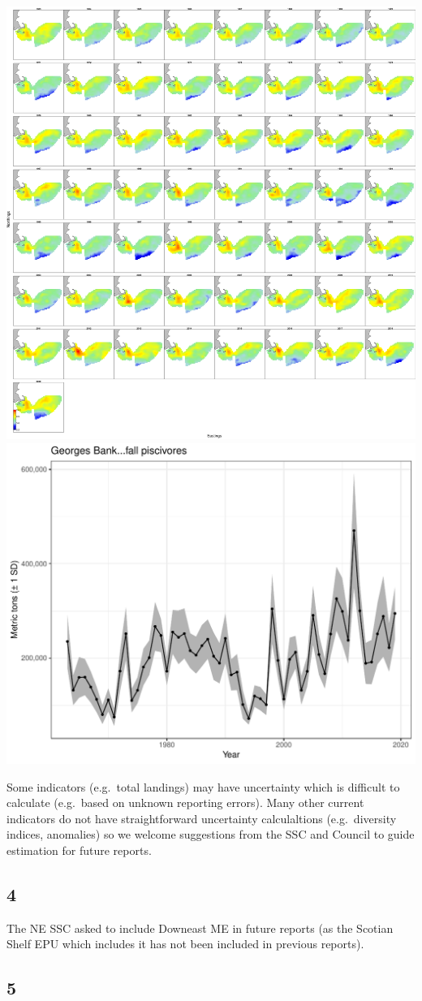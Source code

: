 \documentclass[10pt,]{article}
\let\origfigure\figure
\let\endorigfigure\endfigure
\renewenvironment{figure}[1][2] {
    \expandafter\origfigure\expandafter[H]
} {
    \endorigfigure
}
\begin{document}
\begin{figure}

{\centering \includegraphics[width=0.49\linewidth]{images/ln_density} \includegraphics[width=0.49\linewidth]{images/biomass_plot} 

}

\caption{Georges Bank piscivoves biomass and uncertainty as estimated bythe VAST model.}\label{fig:VASTtest}
\end{figure}

Some indicators (e.g.~total landings) may have uncertainty which is
difficult to calculate (e.g.~based on unknown reporting errors). Many
other current indicators do not have straightforward uncertainty
calculaltions (e.g.~diversity indices, anomalies) so we welcome
suggestions from the SSC and Council to guide estimation for future
reports.

\hypertarget{section-3}{%
\subsection{4}\label{section-3}}

The NE SSC asked to include Downeast ME in future reports (as the
Scotian Shelf EPU which includes it has not been included in previous
reports).

\hypertarget{section-4}{%
\subsection{5}\label{section-4}}
\end{document}
